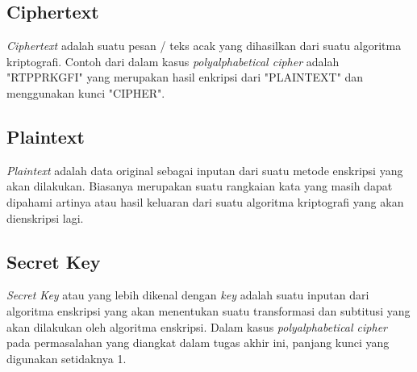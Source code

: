 	\subsection{Ciphertext}
	\textit{Ciphertext} adalah suatu pesan / teks acak yang dihasilkan dari suatu algoritma kriptografi. 
	Contoh dari \ciphertext dalam kasus \textit{polyalphabetical cipher} adalah "RTPPRKGFI" yang merupakan hasil enkripsi dari "PLAINTEXT" dan menggunakan kunci "CIPHER"\cite{william_crytography_2011}.
	
	\subsection{Plaintext}
	\textit{Plaintext} adalah data original sebagai inputan dari suatu metode enskripsi yang akan dilakukan\cite{william_crytography_2011}. Biasanya merupakan suatu rangkaian kata yang masih dapat dipahami artinya atau hasil keluaran dari suatu algoritma kriptografi yang akan dienskripsi lagi.
	
	\subsection{Secret Key}
	\textit{Secret Key} atau yang lebih dikenal dengan \textit{key} adalah suatu inputan dari algoritma enskripsi yang akan menentukan suatu transformasi dan subtitusi yang akan dilakukan oleh algoritma enskripsi\cite{william_crytography_2011}. Dalam kasus \textit{polyalphabetical cipher} pada permasalahan yang diangkat dalam tugas akhir ini, panjang kunci yang digunakan setidaknya 1. 
	
